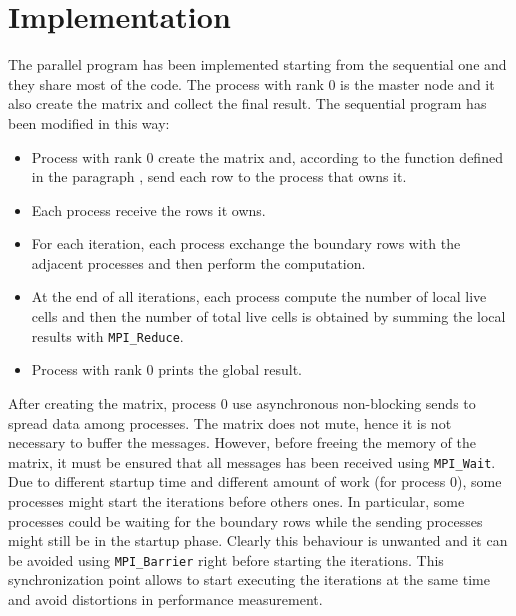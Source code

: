 \documentclass{article}
\begin{document}
\section{Implementation}
The parallel program has been implemented starting from the sequential one and they share most of the code. The process with rank 0 is the master node and it also create the matrix and collect the final result. The sequential program has been modified in this way:
\begin{itemize}
    \item Process with rank 0 create the matrix and, according to the function defined in the paragraph , send each row to the process that owns it.
    \item Each process receive the rows it owns.
    \item For each iteration, each process exchange the boundary rows with the adjacent processes and then perform the computation.
    \item At the end of all iterations, each process compute the number of local live cells and then the number of total live cells is obtained by summing the local results with \texttt{MPI\_Reduce}.
    \item Process with rank 0 prints the global result.
\end{itemize}
After creating the matrix, process 0 use asynchronous non-blocking sends to spread data among processes. The matrix does not mute, hence it is not necessary to buffer the messages. However, before freeing the memory of the matrix, it must be ensured that all messages has been received using \texttt{MPI\_Wait}. \\
Due to different startup time and different amount of work (for process 0), some processes might start the iterations before others ones. In particular, some processes could be waiting for the boundary rows while the sending processes might still be in the startup phase. Clearly this behaviour is unwanted and it can be avoided using \texttt{MPI\_Barrier} right before starting the iterations. This synchronization point allows to start executing the iterations at the same time and avoid distortions in performance measurement. \\
\end{document}
